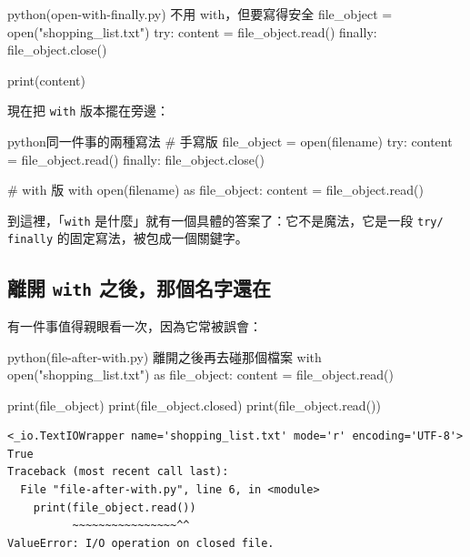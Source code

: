 \begin{example}{python}{(open-with-finally.py) 不用 with，但要寫得安全}
file_object = open("shopping_list.txt")
try:
    content = file_object.read()
finally:
    file_object.close()

print(content)
\end{example}


現在把 \texttt{with} 版本擺在旁邊：

\begin{code}{python}{同一件事的兩種寫法}
# 手寫版
file_object = open(filename)
try:
    content = file_object.read()
finally:
    file_object.close()

# with 版
with open(filename) as file_object:
    content = file_object.read()
\end{code}


到這裡，「\texttt{with} 是什麼」就有一個具體的答案了：它不是魔法，它是一段 \texttt{try/
finally} 的固定寫法，被包成一個關鍵字。

\subsection*{離開 \texttt{with} 之後，那個名字還在}

有一件事值得親眼看一次，因為它常被誤會：

\begin{example}{python}{(file-after-with.py) 離開之後再去碰那個檔案}
with open("shopping_list.txt") as file_object:
    content = file_object.read()

print(file_object)
print(file_object.closed)
print(file_object.read())
\end{example}

\begin{verbatim}
<_io.TextIOWrapper name='shopping_list.txt' mode='r' encoding='UTF-8'>
True
Traceback (most recent call last):
  File "file-after-with.py", line 6, in <module>
    print(file_object.read())
          ~~~~~~~~~~~~~~~~^^
ValueError: I/O operation on closed file.
\end{verbatim}


